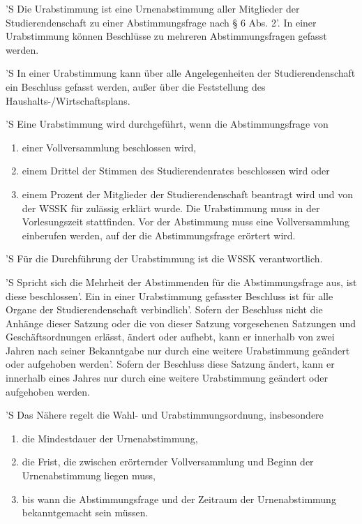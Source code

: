 \documentclass[fontsize=12pt,parskip=half]{scrartcl}
\begin{document}
\begin{contract}


  'S Die Urabstimmung ist eine Urnenabstimmung aller Mitglieder der
  Studierendenschaft zu einer Abstimmungsfrage nach § 6 Abs. 2'. In einer
  Urabstimmung können Beschlüsse zu mehreren Abstimmungsfragen gefasst werden.

  'S In einer Urabstimmung kann über alle Angelegenheiten der Studierendenschaft
  ein Beschluss gefasst werden, außer über die Feststellung des
  Haushalts-/Wirtschaftsplans.

  'S Eine Urabstimmung wird durchgeführt, wenn die Abstimmungsfrage von
  \begin{enumerate}[\qquad 1.]
  \item einer Vollversammlung beschlossen wird,
  \item einem Drittel der Stimmen des Studierendenrates beschlossen wird oder
  \item einem Prozent der Mitglieder der Studierendenschaft beantragt wird und
    von der WSSK für zulässig erklärt wurde. Die Urabstimmung muss in der
    Vorlesungszeit stattfinden. Vor der Abstimmung muss eine Vollversammlung
    einberufen werden, auf der die Abstimmungsfrage erörtert wird.
  \end{enumerate}

  'S Für die Durchführung der Urabstimmung ist die WSSK verantwortlich.

  'S Spricht sich die Mehrheit der Abstimmenden für die Abstimmungsfrage aus, ist
  diese beschlossen'. Ein in einer Urabstimmung gefasster Beschluss ist für alle
  Organe der Studierendenschaft verbindlich'. Sofern der Beschluss nicht die
  Anhänge dieser Satzung oder die von dieser Satzung vorgesehenen Satzungen und
  Geschäftsordnungen erlässt, ändert oder aufhebt, kann er innerhalb von zwei
  Jahren nach seiner Bekanntgabe nur durch eine weitere Urabstimmung geändert
  oder aufgehoben werden'. Sofern der Beschluss diese Satzung ändert, kann er
  innerhalb eines Jahres nur durch eine weitere Urabstimmung geändert oder
  aufgehoben werden.

  'S Das Nähere regelt die Wahl- und Urabstimmungsordnung, insbesondere
  \begin{enumerate}[\qquad 1.]
  \item die Mindestdauer der Urnenabstimmung,
  \item die Frist, die zwischen erörternder Vollversammlung und Beginn der
    Urnenabstimmung liegen muss,
  \item bis wann die Abstimmungsfrage und der Zeitraum der Urnenabstimmung
    bekanntgemacht sein müssen.
  \end{enumerate}



\end{contract}
\end{document}
